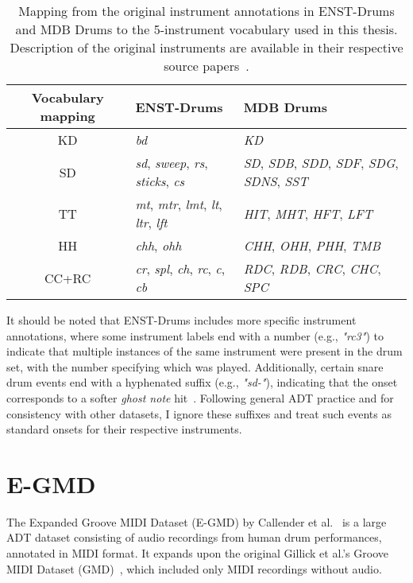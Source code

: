 \begin{table}[H]
    \centering
    \hspace*{-0.6cm}
    \begin{tabular}{c|ll}
        Vocabulary mapping & ENST-Drums & MDB Drums \\
        \hline
        \acrfull{KD} & \textit{bd} & \textit{KD} \\
        \acrfull{SD} & \textit{sd}, \textit{sweep}, \textit{rs}, \textit{sticks}, \textit{cs} & \textit{SD}, \textit{SDB}, \textit{SDD}, \textit{SDF}, \textit{SDG}, \textit{SDNS}, \textit{SST} \\
        \acrfull{TT} & \textit{mt}, \textit{mtr}, \textit{lmt}, \textit{lt}, \textit{ltr}, \textit{lft} & \textit{HIT}, \textit{MHT}, \textit{HFT}, \textit{LFT} \\
        \acrfull{HH} & \textit{chh}, \textit{ohh} & \textit{CHH}, \textit{OHH}, \textit{PHH}, \textit{TMB} \\
        \acrfull{CC+RC} & \textit{cr}, \textit{spl}, \textit{ch}, \textit{rc}, \textit{c}, \textit{cb} & \textit{RDC}, \textit{RDB}, \textit{CRC}, \textit{CHC}, \textit{SPC} \\
    \end{tabular}
    \caption{Mapping from the original instrument annotations in ENST-Drums and MDB Drums to the 5-instrument vocabulary used in this thesis. Description of the original instruments are available in their respective source papers~\cite{gillet2006enst, southall2017mdb}.}
    \label{ENSTMDBMapping}
\end{table}

It should be noted that ENST-Drums includes more specific instrument annotations, where some instrument labels end with a number (e.g., \textit{"rc3"}) to indicate that multiple instances of the same instrument were present in the drum set, with the number specifying which was played. Additionally, certain snare drum events end with a hyphenated suffix (e.g., \textit{"sd-"}), indicating that the onset corresponds to a softer \textit{ghost note} hit~\cite{gillet2006enst}. Following general \gls{ADT} practice and for consistency with other datasets, I ignore these suffixes and treat such events as standard onsets for their respective instruments.

\section{E-GMD}

The Expanded Groove MIDI Dataset (E-GMD) by Callender et al.~\cite{callender2020improvingperceptualqualitydrum} is a large \gls{ADT} dataset consisting of audio recordings from human drum performances, annotated in MIDI format. It expands upon the original Gillick et al.'s Groove MIDI Dataset (GMD)~\cite{pmlr-v97-gillick19a}, which included only MIDI recordings without audio.

